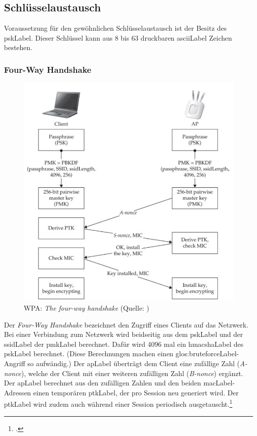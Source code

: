 \subsection{Schlüsselaustausch}
Voraussetzung für den gewöhnlichen Schlüsselaustausch ist der Besitz des \gls{pskLabel}.
Dieser Schlüssel kann aus 8 bis 63 druckbaren \gls{asciiLabel} Zeichen bestehen.

\subsubsection{Four-Way Handshake}
\begin{figure}[H]
	\centering
	\includegraphics[width=0.8\linewidth]{images/wpa/four-way-handshake.png}
	\caption[WPA: The four-way handshake]{WPA: \textit{The four-way handshake} (Quelle: \cite[][151]{WrightCache201503})}
\end{figure}
Der \textit{Four-Way Handshake} bezeichnet den Zugriff eines Clients auf das Netzwerk.
Bei einer Verbindung zum Netzwerk wird beidseitig aus dem \gls{pskLabel} und der \gls{ssidLabel} der \gls{pmkLabel} berechnet.
Dafür wird 4096 mal ein \gls{hmacshaLabel} des \gls{pskLabel} berechnet. (Diese Berechnungen machen einen \gls{glos:bruteforceLabel}-Angriff so aufwändig.)
Der \gls{apLabel} überträgt dem Client eine zufällige Zahl (\textit{A-nonce}), welche der Client mit einer weiteren zufälligen Zahl (\textit{B-nonce}) ergänzt.
Der \gls{apLabel} berechnet aus den zufälligen Zahlen und den beiden \gls{macLabel}-Adressen einen temporären \gls{ptkLabel}, der pro Session neu generiert wird. Der \gls{ptkLabel} wird zudem auch während einer Session periodisch ausgetauscht.\footcite[][40f.]{WrightCache201503}

